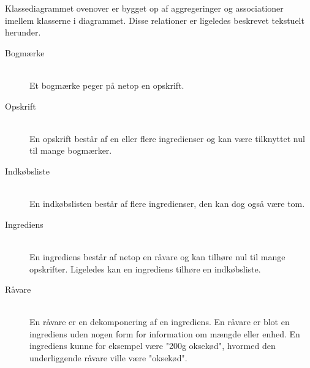 Klassediagrammet ovenover er bygget op af aggregeringer og associationer imellem klasserne i diagrammet. Disse relationer er ligeledes beskrevet tekstuelt herunder.

\begin{description}
  \item[Bogmærke] \hfill \\
    Et bogmærke peger på netop en opskrift.

  \item[Opskrift] \hfill \\
    En opskrift består af en eller flere ingredienser og kan være tilknyttet nul til mange bogmærker.

\item[Indkøbsliste] \hfill \\
  En indkøbslisten består af flere ingredienser, den kan dog også være tom.

\item[Ingrediens] \hfill \\
  En ingrediens består af netop en råvare og kan tilhøre nul til mange opskrifter. Ligeledes kan en ingrediens tilhøre en indkøbsliste.

\item[Råvare] \hfill \\
  En råvare er en dekomponering af en ingrediens. En råvare er blot en ingrediens uden nogen form for information om mængde eller enhed. En ingrediens kunne for eksempel være "200g oksekød", hvormed den underliggende råvare ville være "oksekød".
\end{description}

